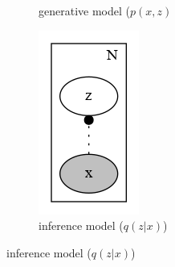 \documentclass[11pt, a4paper]{report}
\theoremstyle{plain}
\theoremstyle{definition}
\theoremstyle{remark}
\begin{document}
\begin{figure}
\begin{subfigure}[b]{0.2\textwidth}
\caption{generative model ($p(x,z)$}
\end{subfigure}
\begin{subfigure}[b]{0.2\textwidth}
\includegraphics[width=\textwidth]{../plots/vae_q.gv.png}
\caption{inference model ($q(z|x)$)}
\end{subfigure}

\end{figure}
\end{document}
